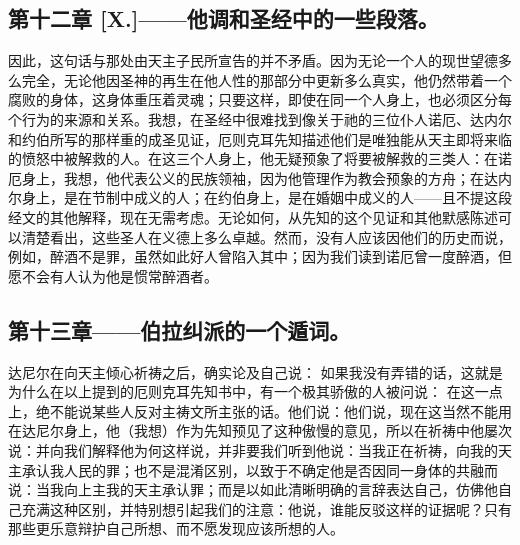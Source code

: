 
\subsection{第十二章 [X.]——他调和圣经中的一些段落。}

因此，这句话与那处由天主子民所宣告的并不矛盾。因为无论一个人的现世望德多么完全，无论他因圣神的再生在他人性的那部分中更新多么真实，他仍然带着一个腐败的身体，这身体重压着灵魂；只要这样，即使在同一个人身上，也必须区分每个行为的来源和关系。我想，在圣经中很难找到像关于祂的三位仆人诺厄、达内尔和约伯所写的那样重的成圣见证，厄则克耳先知描述他们是唯独能从天主即将来临的愤怒中被解救的人。在这三个人身上，他无疑预象了将要被解救的三类人：在诺厄身上，我想，他代表公义的民族领袖，因为他管理作为教会预象的方舟；在达内尔身上，是在节制中成义的人；在约伯身上，是在婚姻中成义的人——且不提这段经文的其他解释，现在无需考虑。无论如何，从先知的这个见证和其他默感陈述可以清楚看出，这些圣人在义德上多么卓越。然而，没有人应该因他们的历史而说，例如，醉酒不是罪，虽然如此好人曾陷入其中；因为我们读到诺厄曾一度醉酒，但愿不会有人认为他是惯常醉酒者。\par


\subsection{第十三章——伯拉纠派的一个遁词。}

达尼尔在向天主倾心祈祷之后，确实论及自己说： 如果我没有弄错的话，这就是为什么在以上提到的厄则克耳先知书中，有一个极其骄傲的人被问说： 在这一点上，绝不能说某些人反对主祷文所主张的话。他们说：他们说，现在这当然不能用在达尼尔身上，他（我想）作为先知预见了这种傲慢的意见，所以在祈祷中他屡次说：并向我们解释他为何这样说，并非要我们听到他说：当我正在祈祷，向我的天主承认我人民的罪；也不是混淆区别，以致于不确定他是否因同一身体的共融而说：当我向上主我的天主承认罪；而是以如此清晰明确的言辞表达自己，仿佛他自己充满这种区别，并特别想引起我们的注意：他说，谁能反驳这样的证据呢？只有那些更乐意辩护自己所想、而不愿发现应该所想的人。\par

